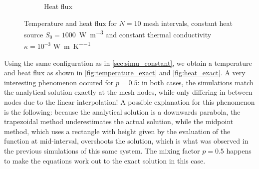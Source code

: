 \begin{figure}[h]
\begin{subfigure}{0.48\linewidth}
        \caption{Heat flux}
        \label{fig:heat_exact}
    \end{subfigure}
    \caption{Temperature and heat flux for \(N = 10\) mesh intervals, constant heat source \mbox{\(S_0 = 1000\) \si{\watt\per\meter\cubed}} and constant thermal conductivity \(\kappa = 10^{-3}\) \si{\watt\per\meter\per\kelvin}}
\end{figure}
Using the same configuration as in \autoref{sec:simu_constant}, we obtain a temperature and heat flux as shown in \autoref{fig:temperature_exact} and \autoref{fig:heat_exact}. A very interesting phenomenon occured for $p=0.5$: in both cases, the simulations match the analytical solution exactly at the mesh nodes, while only differing in between nodes due to the linear interpolation! A possible explanation for this phenomenon is the following: because the analytical solution is a downwards parabola, the trapezoidal method underestimates the actual solution, while the midpoint method, which uses a rectangle with height given by the evaluation of the function at mid-interval, overshoots the solution, which is what was observed in the previous simulations of this same system. The mixing factor \(p=0.5\) happens to make the equations work out to the exact solution in this case.


